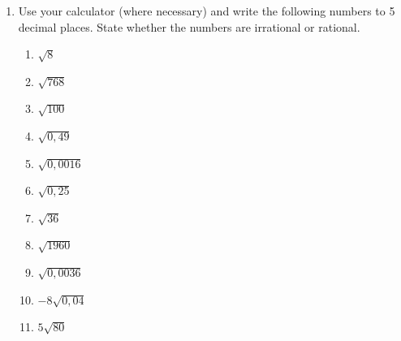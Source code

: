 \begin{enumerate}[noitemsep, label=\textbf{\arabic*}. ]
        \label{m38349*uid32}\item Use your calculator (where necessary) and write the following numbers to 5 decimal places. State whether the numbers are irrational or rational.
\label{m38349*id326080}\begin{enumerate}[noitemsep, label=\textbf{\alph*}. ] 
            \label{m38349*uid33}\item \begin{math}\sqrt{8}\end{math}\label{m38349*uid34}\item \begin{math}\sqrt{768}\end{math}\label{m38349*uid35}\item \begin{math}\sqrt{100}\end{math}\label{m38349*uid36}\item \begin{math}\sqrt{0,49}\end{math}\label{m38349*uid37}\item \begin{math}\sqrt{0,0016}\end{math}\label{m38349*uid38}\item \begin{math}\sqrt{0,25}\end{math}\label{m38349*uid39}\item \begin{math}\sqrt{36}\end{math}\label{m38349*uid40}\item \begin{math}\sqrt{1960}\end{math}\label{m38349*uid41}\item \begin{math}\sqrt{0,0036}\end{math}\label{m38349*uid42}\item \begin{math}-8\sqrt{0,04}\end{math}\label{m38349*uid43}\item \begin{math}5\sqrt{80}\end{math}\end{enumerate}
        

\end{enumerate}
